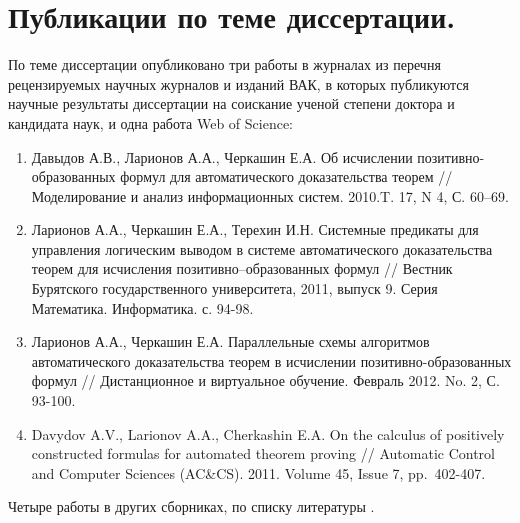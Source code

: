 \section*{Публикации по теме диссертации.} По теме диссертации опубликовано три работы в журналах из перечня рецензируемых научных журналов и изданий ВАК, в которых публикуются научные результаты диссертации на соискание ученой степени доктора и кандидата наук, и одна работа Web of Science:
\begin{enumerate}
\item Давыдов А.В., Ларионов А.А., Черкашин Е.А. Об исчислении позитивно-образованных формул для автоматического доказательства теорем // Моделирование и анализ информационных систем. 2010.T. 17, N 4, С. 60--69.
\item Ларионов А.А., Черкашин Е.А., Терехин И.Н. Системные предикаты для управления логическим выводом в системе автоматического доказательства теорем для исчисления позитивно--образованных формул // Вестник Бурятского государственного университета, 2011, выпуск 9. Серия Математика. Информатика. с. 94-98.
\item Ларионов А.А., Черкашин Е.А. Параллельные схемы алгоритмов автоматического доказательства теорем в исчислении
позитивно-образованных формул // Дистанционное и виртуальное обучение. Февраль 2012. No. 2, С. 93-100.
\item Davydov A.V., Larionov A.A., Cherkashin E.A. On the calculus of positively constructed formulas for automated theorem proving // Automatic Control and Computer Sciences (AC\&CS). 2011. Volume 45, Issue 7, pp.~402-407.
\end{enumerate}

Четыре работы в других сборниках, по списку литературы \cite{viner, QUANT4, mipro, semver}.



